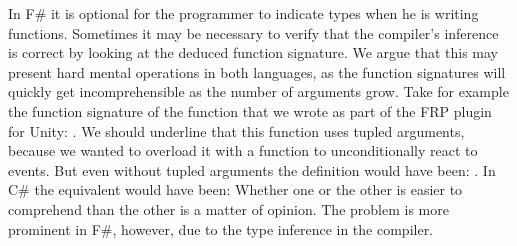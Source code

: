 In F\# it is optional for the programmer to indicate types when he is writing functions. Sometimes it may be necessary to verify that the compiler's inference is correct by looking at the deduced function signature. We argue that this may present hard mental operations in both languages, as the function signatures will quickly get incomprehensible as the number of arguments grow. Take for example the function signature of the  function that we wrote as part of the \gls{FRP} plugin for Unity: 
\newline
{}.\newline
We should underline that this function uses tupled arguments, because we wanted to overload it with a function to unconditionally react to events. But even without tupled arguments the definition would have been:\newline
{}.\newline
In C\# the equivalent would have been:\newline
{}\newline
Whether one or the other is easier to comprehend than the other is a matter of opinion. The problem is more prominent in F\#, however, due to the type inference in the compiler.